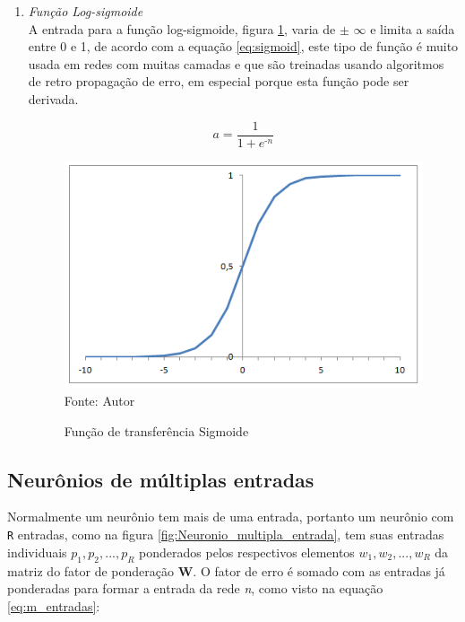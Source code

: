 \documentclass[
	12pt,				%
    oneside,			%
	a4paper,			%
	english,			%
	french,				%
	spanish,			%
	brazil,				%
	]{abntex2}
\begin{document}
\begin{enumerate}
  \item \textit{Função Log-sigmoide}\\
  A entrada para a função log-sigmoide, figura \ref{fig:Sigmoid}, varia de $\pm$  $\infty$ e limita a saída entre 0 e 1, de acordo com a equação \ref{eq:sigmoid}, este tipo de função é muito usada em redes com muitas camadas e que são treinadas usando algoritmos de retro propagação de erro, em especial porque esta função pode ser derivada.
  
  
  \begin{equation}
    a = \frac{1}{1+\textit{$e^\textit{-n}$}}
    \label{eq:sigmoid}
  \end{equation}
  
  \begin{figure}[H]
    \centering
    \caption{Função de transferência Sigmoide}
    \includegraphics[scale=0.75]{Sigmoid}\\
    Fonte: Autor\hfill
    \label{fig:Sigmoid}
\end{figure}
  
\end{enumerate}


\subsection {Neurônios de múltiplas entradas}

Normalmente um neurônio tem mais de uma entrada, portanto um neurônio com \texttt{R} entradas, como na figura \ref{fig:Neuronio_multipla_entrada}, tem suas entradas individuais \textit{\(p_1, p_2,...,p_R \)}  ponderados pelos respectivos elementos \textit{\(w_1, w_2,...,w_R \)} da matriz do fator de ponderação \textbf{W}. O fator de erro é somado com as entradas já ponderadas para formar a entrada da rede \textit{n}, como visto na equação \ref{eq:m_entradas}: 
\end{document}
